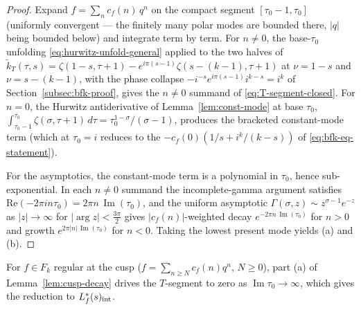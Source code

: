 \documentclass[11pt]{article}
\numberwithin{equation}{section}  %
\DeclareMathOperator{\im}{Im}
\begin{document}
\begin{proof}
Expand $f = \sum_n c_f(n)\,q^n$ on the compact segment
$[\tau_0 - 1, \tau_0]$ (uniformly convergent --- the finitely many
polar modes are bounded there, $|q|$ being bounded below) and integrate
term by term.  For $n \ne 0$, the base-$\tau_0$ unfolding
\eqref{eq:hurwitz-unfold-general} applied to the two halves of
$\widetilde{k}_T(\tau, s) = \zeta(1 - s, \tau + 1) - e^{i\pi(s-1)}\zeta(s - (k-1), \tau + 1)$
at $\nu = 1 - s$ and $\nu = s - (k - 1)$, with the phase collapse
$-i^{-s}e^{i\pi(s-1)}i^{k-s} = i^k$ of Section~\ref{subsec:bfk-proof}, gives
the $n \ne 0$ summand of \eqref{eq:T-segment-closed}.  For $n = 0$, the
Hurwitz antiderivative of Lemma~\ref{lem:const-mode} at base $\tau_0$,
$\int_{\tau_0 - 1}^{\tau_0}\zeta(\sigma, \tau + 1)\,d\tau = \tau_0^{1-\sigma}/(\sigma - 1)$,
produces the bracketed constant-mode term (which at $\tau_0 = i$
reduces to the $-c_f(0)(1/s + i^k/(k-s))$ of
\eqref{eq:bfk-eq-statement}).

For the asymptotics, the constant-mode term is a polynomial in $\tau_0$,
hence sub-exponential.  In each $n \ne 0$ summand the incomplete-gamma
argument satisfies $\mathrm{Re}(-2\pi i n\tau_0) = 2\pi n\,\im(\tau_0)$,
and the uniform asymptotic $\Gamma(\sigma, z) \sim z^{\sigma - 1}e^{-z}$
as $|z| \to \infty$ for $|\arg z| < \tfrac{3\pi}{2}$ \cite[\S8.11]{DLMF}
gives $|c_f(n)|$-weighted decay $e^{-2\pi n\,\im(\tau_0)}$ for $n > 0$
and growth $e^{2\pi|n|\,\im(\tau_0)}$ for $n < 0$.  Taking the lowest
present mode yields (a) and (b).
\end{proof}

For $f \in F_k$ regular at the cusp ($f = \sum_{n \ge N}c_f(n)q^n$,
$N \ge 0$), part (a) of Lemma~\ref{lem:cusp-decay} drives the
$T$-segment to zero as $\im\tau_0 \to \infty$, which gives the
reduction to $L_f^*(s)_{\rm int}$.
\end{document}
